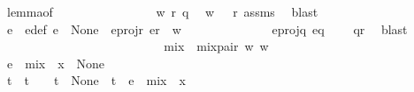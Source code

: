 \begin{isabellebody}
\ lemma{}{\isacharunderscore}{\kern0pt}{}{\isacharbrackleft}{\kern0pt}of\isanewline
\ \ \ \ \ \ \ \ \ \ \ \ \ \ \ \ w{\isacharprime}{\kern0pt}{\isacharprime}{\kern0pt}\ r\ q{\isacharbrackright}{\kern0pt}\ \isamarkupfalse%
\ {\isacartoucheopen}w{\isacharprime}{\kern0pt}{\isacharprime}{\kern0pt}\ {\isasymin}\ {\isasymL}\isactrlsup {\isacharasterisk}{\kern0pt}\ r{\isacartoucheclose}\ assms\ \isamarkupfalse%
\ blast\ \isanewline
\ \ \ \ \ \ \ \ \ \ \isamarkupfalse%
\ \isamarkupfalse%
\ e\ \ e{\isacharunderscore}{\kern0pt}def{\isacharcolon}{\kern0pt}\ {\isachardoublequoteopen}e\ {\isasymin}\ {\isasymT}\isactrlbsub None\isactrlesub {\isachardoublequoteclose}\ \ e{\isacharunderscore}{\kern0pt}proj{\isacharunderscore}{\kern0pt}r{\isacharcolon}{\kern0pt}\ {\isachardoublequoteopen}e{\isasymdown}\isactrlsub r\ {\isacharequal}{\kern0pt}\ w{\isacharprime}{\kern0pt}{\isacharprime}{\kern0pt}{\isachardoublequoteclose}\ \isanewline
\ \ \ \ \ \ \ \ \ \ \ \ \ e{\isacharunderscore}{\kern0pt}proj{\isacharunderscore}{\kern0pt}q{\isacharcolon}{\kern0pt}\ {\isachardoublequoteopen}e{\isasymdown}\isactrlsub q\ {\isacharequal}{\kern0pt}\ {\isasymepsilon}{\isachardoublequoteclose}\ \isamarkupfalse%
\ qr\ \isamarkupfalse%
\ blast\isanewline
\ \ \ \ \ \ \ \ \ \ \ \ \ \ \isanewline
\ \ \ \ \ \ \ \ \ \ \isamarkupfalse%
\ {\isacharquery}{\kern0pt}mix\ {\isacharequal}{\kern0pt}\ {\isachardoublequoteopen}{\isacharparenleft}{\kern0pt}mix{\isacharunderscore}{\kern0pt}pair\ w{\isacharprime}{\kern0pt}\ w\ {\isacharbrackleft}{\kern0pt}{\isacharbrackright}{\kern0pt}{\isacharparenright}{\kern0pt}{\isachardoublequoteclose}\isanewline
\ \ \ \ \ \ \ \ \ \ \ \ \isanewline
\ \ \ \ \ \ \ \ \ \ \isamarkupfalse%
\ {\isachardoublequoteopen}e\ {\isasymsqdot}\ {\isacharquery}{\kern0pt}mix\ {\isasymsqdot}\ x{\isacharprime}{\kern0pt}\ {\isasymin}\ {\isasymT}\isactrlbsub None\isactrlesub {\isachardoublequoteclose}\ \isamarkupfalse%
\isanewline
\ \ \ \ \ \ \ \ \ \ \ \ \ \ \isanewline
\ \ \ \ \ \ \ \ \ \ \isamarkupfalse%
\ \isamarkupfalse%
\ t\ \ {\isachardoublequoteopen}t\ {\isasymin}\ {\isasymL}\isactrlsub {\isasymzero}\ {\isasymand}\ t\ {\isasymin}\ {\isasymT}\isactrlbsub None\isactrlesub {\isasymdownharpoonright}\isactrlsub {\isacharbang}{\kern0pt}\ {\isasymand}\ t\ {\isacharequal}{\kern0pt}\ {\isacharparenleft}{\kern0pt}e\ {\isasymsqdot}\ {\isacharquery}{\kern0pt}mix\ {\isasymsqdot}\ x{\isacharprime}{\kern0pt}{\isacharparenright}{\kern0pt}{\isasymdown}\isactrlsub {\isacharbang}{\kern0pt}{\isachardoublequoteclose}\ \isamarkupfalse%

\end{isabellebody}
